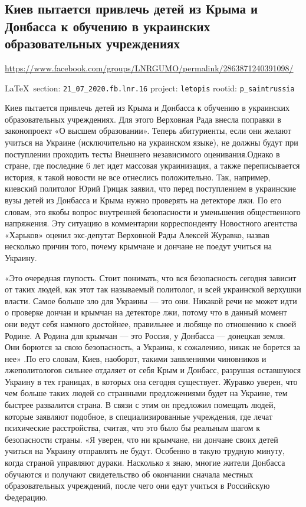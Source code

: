  
 
\subsection{Киев пытается привлечь детей из Крыма и Донбасса к обучению в украинских образовательных учреждениях}
\label{sec:21_07_2020.fb.lnr.16}
\url{https://www.facebook.com/groups/LNRGUMO/permalink/2863871240391098/}
  
\vspace{0.5cm}
{\small\LaTeX~section: \verb|21_07_2020.fb.lnr.16| project: \verb|letopis| rootid: \verb|p_saintrussia|}
\vspace{0.5cm}
  
Киев пытается привлечь детей из Крыма и Донбасса к обучению в украинских
образовательных учреждениях. Для этого Верховная Рада внесла поправки в
законопроект «О высшем образовании». Теперь абитуриенты, если они желают
учиться на Украине (исключительно на украинском языке), не должны будут при
поступлении проходить тесты Внешнего независимого оценивания.Однако в стране,
где последние 6 лет идет массовая украинизация, а также переписывается история,
к такой новости не все отнеслись положительно. Так, например, киевский
политолог Юрий Грицак заявил, что перед поступлением в украинские вузы детей из
Донбасса и Крыма нужно проверять на детекторе лжи. По его словам, это якобы
вопрос внутренней безопасности и уменьшения общественного напряжения. Эту
ситуацию в комментарии корреспонденту Новостного агентства «Харьков» оценил
экс-депутат Верховной Рады Алексей Журавко, назвав несколько причин того,
почему крымчане и дончане не поедут учиться на Украину.

«Это очередная глупость. Стоит понимать, что вся безопасность сегодня зависит
от таких людей, как этот так называемый политолог, и всей украинской верхушки
власти. Самое больше зло для Украины --- это они.  Никакой речи не может идти о
проверке дончан и крымчан на детекторе лжи, потому что в данный момент они
ведут себя намного достойнее, правильнее и любяще по отношению к своей Родине.
А Родина для крымчан --- это Россия, у Донбасса --- донецкая земля. Они борются за
свою безопасность, а Украина, к сожалению, никак не борется за нее» .По его
словам, Киев, наоборот, такими заявлениями чиновников и лжеполитологов сильнее
отдаляет от себя Крым и Донбасс, разрушая оставшуюся Украину в тех границах, в
которых она сегодня существует. Журавко уверен, что чем больше таких людей со
странными предложениями будет на Украине, тем быстрее развалится страна. В
связи с этим он предложил помещать людей, которые заявляют подобное, в
специализированные учреждения, где лечат психические расстройства, считая, что
это было бы реальным шагом к безопасности страны.  «Я уверен, что ни крымчане,
ни дончане своих детей учиться на Украину отправлять не будут. Особенно в такую
трудную минуту, когда страной управляют дураки. Насколько я знаю, многие жители
Донбасса обучаются и получают свидетельство об окончании сначала местных
образовательных учреждений, после чего они едут учиться в Российскую Федерацию.

